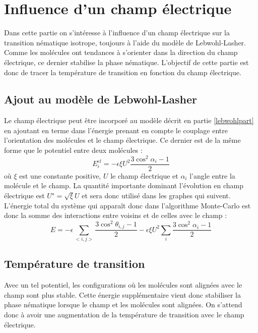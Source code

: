 \documentclass[11pt,a4paper]{article}
\numberwithin{equation}{section}
\begin{document}
\newpage
\section{Influence d'un champ électrique}


Dans cette partie on s'intéresse à l'influence d'un champ électrique sur la transition nématique isotrope, toujours à l'aide du modèle de Lebwohl-Lasher. Comme les molécules ont tendances à s'orienter dans la direction du champ électrique, ce dernier stabilise la phase nématique. L'objectif de cette partie est donc de tracer la température de transition en fonction du champ électrique.
\subsection{Ajout au modèle de Lebwohl-Lasher}
Le champ électrique peut être incorporé au modèle décrit en partie \ref{lebwohlpart} en ajoutant en terme dans l'énergie prenant en compte le couplage entre l'orientation des molécules et le champ électrique. Ce dernier est de la même forme que le potentiel entre deux molécules \cite{entropicelectric,electric3, biolo}:
\begin{equation}
E_{i}^{el} = - \epsilon \xi U^2 \frac{3\cos^2\alpha_i-1}{2}
\label{interactfield}
\end{equation}
où $\xi$ est une constante positive, $U$ le champ électrique et $\alpha_{i}$ l'angle entre la molécule et le champ. La quantité importante dominant l'évolution en champ électrique est $U^\star = \sqrt{\xi} U$ et sera donc utilisé dans les graphes qui suivent. L'énergie total du système qui apparaît donc dans l'algorithme Monte-Carlo est donc la somme des interactions entre voisins et de celles avec le champ :
\begin{equation}
E = - \epsilon\sum_{<i,j>} \frac{3\cos^2\theta_{i,j}-1}{2} - \epsilon \xi U^2 \sum_{i}\frac{3\cos^2\alpha_i-1}{2}
\end{equation}

\subsection{Température de transition}
Avec un tel potentiel, les configurations où les molécules sont alignées avec le champ sont plus stable. Cette énergie supplémentaire vient donc stabiliser la phase nématique lorsque le champ et les molécules sont alignées. On s'attend donc à avoir une augmentation de la température de transition avec le champ électrique.
\end{document}

